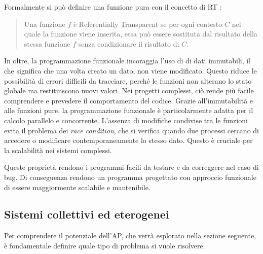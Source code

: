 \documentclass[12pt,a4paper,openright,twoside]{book}
\begin{document}
Formalmente si può definire una funzione pura con il concetto di \ac{RT} \cite{Hunt2018}:

\begin{quote}
    Una funzione $f$ è Referentially Transparent se per ogni contesto $C$ nel quale la funzione viene inserita, essa può essere sostituta dal risultato della stessa funzione $f$ senza condizionare il risultato di $C$.
\end{quote}

In oltre, la programmazione funzionale incoraggia l'uso di di dati immutabili, il che significa che una volta creato un dato, non viene modificato. Questo riduce le possibilità di errori difficili da tracciare, perché le funzioni non alterano lo stato globale ma restituiscono nuovi valori. Nei progetti complessi, ciò rende più facile comprendere e prevedere il comportamento del codice.  Grazie all'immutabilità e alle funzioni pure, la programmazione funzionale è particolarmente adatta per il calcolo parallelo e concorrente. L'assenza di modifiche condivise tra le funzioni evita il problema dei \textit{race condition}, che si verifica quando due processi cercano di accedere o modificare contemporaneamente lo stesso dato. Questo è cruciale per la scalabilità nei sistemi complessi.

Queste proprietà rendono i programmi facili da testare e da correggere nel caso di bug. Di conseguenza rendono un programma progettato con approccio funzionale di essere maggiormente scalabile e mantenibile.

\subsection{Sistemi collettivi ed eterogenei} 

Per comprendere il potenziale dell'\ac{AP}, che verrà esplorato nella sezione seguente, è fondamentale definire quale tipo di problema si vuole risolvere. 
\end{document}
